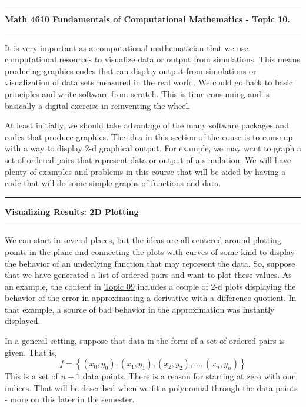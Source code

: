 \documentclass[10pt,fleqn]{article}
\begin{document}
\vskip0.1in\hrule\vskip0.1in \noindent
{\bf Math 4610 Fundamentals of Computational Mathematics  - Topic 10.}
\vskip0.1in\hrule\vskip0.1in \noindent
It is very important as a computational mathematician that we use computational
resources to visualize data or output from simulations. This means producing
graphics codes that can display output from simulations or visualization of data
sets measured in the real world. We could go back to basic principles and write
software from scratch. This is time consuming and is basically a digital
exercise in reinventing the wheel.

At least initially, we should take advantage of the many software packages and
codes that produce graphics. The idea in this section of the couse is to come up
with a way to display 2-d graphical output. For example, we may want to graph a
set of ordered pairs that represent data or output of a simulation. We will have
plenty of examples and problems in this course that will be aided by having a
code that will do some simple graphs of functions and data.
\vskip0.1in\hrule\vskip0.1in\noindent
{\bf Visualizing Results: 2D Plotting} 
\vskip0.1in\hrule\vskip0.1in\noindent
We can start in several places, but the ideas are all centered around plotting
points in the plane and connecting the plots with curves of some kind to display
the behavior of an underlying function that may represent the data. So, suppose
that we have generated a list of ordered pairs and want to plot these values. As
an example, the content in \href{../../topic_09/html/topic_09.html}{Topic 09}
includes a couple of 2-d plots displaying the behavior of the error in
approximating a derivative with a difference quotient. In that example, a source
of bad behavior in the approximation was instantly displayed. 

In a general setting, suppose that data in the form of a set of ordered pairs is
given. That is,
\[
  f = \left\lbrace 
       (x_0, y_0), (x_1, y_1), (x_2, y_2), \ldots, (x_n, y_n)
      \right\rbrace 
\]
This is a set of \(n+1\) data points. There is a reason for starting at zero
with our indices. That will be described when we fit a polynomial through the
data points - more on this later in the semester.
\end{document}
